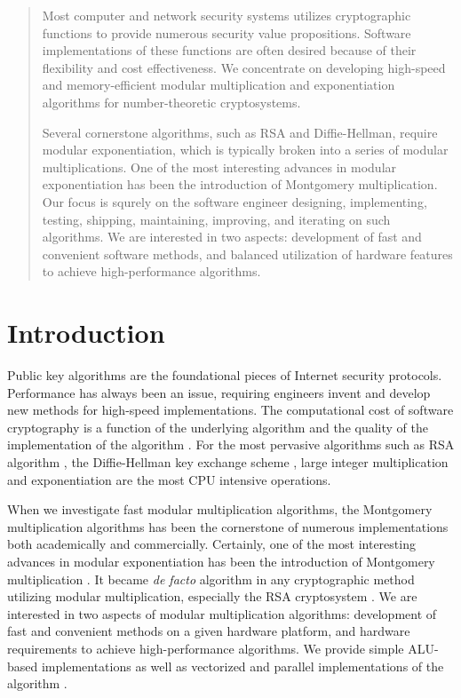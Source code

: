 \documentclass[twocolumn]{svjour3}          %
\begin{document}
\begin{abstract}

Most computer and network security systems utilizes cryptographic functions
to provide numerous security value propositions.
Software implementations of these functions
are often desired because of their flexibility and cost effectiveness.
We concentrate on developing high-speed and memory-efficient modular
multiplication and exponentiation algorithms for number-theoretic
cryptosystems.

Several cornerstone algorithms, such as RSA and Diffie-Hellman, require
modular exponentiation, which is typically broken into a series of
modular multiplications.  One of the most interesting advances in
modular exponentiation has been the introduction of Montgomery
multiplication. Our focus is squrely on the software engineer designing,
implementing, testing, shipping, maintaining, improving, and iterating on such algorithms.
We are interested in two aspects: development of fast and convenient software
methods, and balanced utilization of hardware features to achieve
high-performance algorithms.

\end{abstract}


\section{Introduction}
\label{introduction}

Public key algorithms are the foundational pieces of Internet security
protocols. Performance has always been an issue, requiring engineers
invent and develop new methods for high-speed implementations.  The
computational cost of software cryptography is a function of the
underlying algorithm and the quality of the implementation of the
algorithm \cite{RC93:A}. For the most pervasive algorithms such as RSA
algorithm \cite{RSA78:A}, the Diffie-Hellman key exchange scheme
\cite{DH76:New}, large integer multiplication and exponentiation are
the most CPU intensive operations.

When we investigate fast modular multiplication algorithms, the
Montgomery multiplication algorithms has been the cornerstone of
numerous implementations both academically and commercially.
Certainly, one of the most interesting advances in modular
exponentiation has been the introduction of Montgomery multiplication
\cite{M85:Modular}.  It became {\em de facto} algorithm in any
cryptographic method utilizing modular multiplication, especially the
RSA cryptosystem \cite{AKP96:Public,BK95:Fast}.  We are interested in
two aspects of modular multiplication algorithms: development of fast
and convenient methods on a given hardware platform, and hardware
requirements to achieve high-performance algorithms.
We provide simple ALU-based implementations as well as
vectorized and parallel implementations of the algorithm \cite{GK12:Software,PS04:Parallel}.
\end{document}
